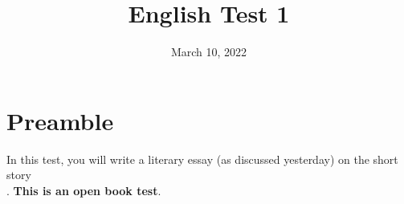 \documentclass[12pt]{article} %
\title{English Test 1}
\date{March 10, 2022}
\begin{document}
    \renewcommand*{\coursecode}{MCR3U Quiz} %
    \renewcommand*{\assgnnumber}{1} %
    \renewcommand*{\submdate}{November, 2021} %
    \renewcommand*{\studentfname}{\textbf{Name:}} %
    \renewcommand*{\studentlname}{} %

    \renewcommand\qedsymbol{$\blacksquare$}
    \setfigpath
    \fancyhfoffset[L,O]{0pt} %




	\maketitle
	\section{Preamble}
  In this test, you will write a literary essay (as discussed yesterday) on the
  short story \\ . \textbf{This is an open book test}.
  
\end{document}
